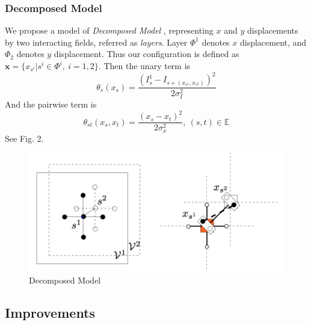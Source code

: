 \documentclass{article} %
\begin{document}
	\subsubsection{Decomposed Model} We propose a model of \emph{Decomposed Model} \cite{kovtun2004image}, representing $x$ and $y$ displacements by two interacting fields, referred as \emph{layers}. Layer $\Phi^1$ denotes $x$ displacement, and $\Phi_2$ denotes $y$ displacement. Thus our configuration is defined as $\mathbf{x} = \{x_{s^i}|s^i\in\Phi^i,\ i = 1,2\}$. Then the unary term is
	\begin{equation}
		\theta_s(x_s) = \frac{\left(I_s^1 - I_{s+(x_{s^1}, x_{s^2})}\right)^2}{2\sigma_I^2}
	\end{equation}
	And the pairwise term is
	\begin{equation}
		\theta_{st}\left(x_s, x_t\right) = \frac{\left(x_s - x_t\right)^2}{2\sigma_x^2},\ (s,t)\in\mathbb{E}
	\end{equation}
	See Fig. 2.
	\begin{figure}[!hb]
	\centering
	\includegraphics[scale=0.7]{decompose.png}
	\caption{Decomposed Model}
	\end{figure}
	\subsection{Improvements}
\end{document}
